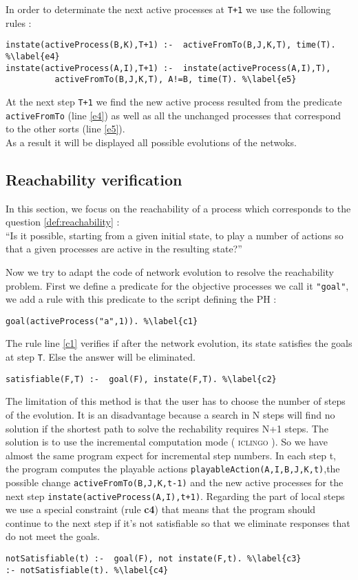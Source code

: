 In order to determinate the next active processes at \texttt{T+1} we use the following rules :
\begin{lstlisting}
instate(activeProcess(B,K),T+1) :-  activeFromTo(B,J,K,T), time(T). %\label{e4}
instate(activeProcess(A,I),T+1) :-  instate(activeProcess(A,I),T),
          activeFromTo(B,J,K,T), A!=B, time(T). %\label{e5}
\end{lstlisting}

At the next step \texttt{T+1} we find the new active process resulted from the predicate \texttt{activeFromTo} (line \ref{e4}) as well as all the unchanged processes that correspond to the other sorts (line \ref{e5}).\\
As a result it will be displayed all possible evolutions of the netwoks.
\subsection{Reachability verification}
In this section, we focus on the reachability of a process which corresponds to the question \ref{def:reachability} :\\
“Is it possible, starting from a given initial state, to play a number of actions so that a given processes are active in the resulting state?”

\noindent Now we try to adapt the code of network evolution to resolve the reachability problem. First we define a predicate for the objective processes we call it \texttt{"goal"}, we add a rule with this predicate to the script defining the PH :
\begin{lstlisting}
goal(activeProcess("a",1)). %\label{c1}
\end{lstlisting}
The rule line \ref{c1} verifies if after the network evolution, its state satisfies the goals at step \texttt{T}. Else the answer will be eliminated.
\begin{lstlisting}
satisfiable(F,T) :-  goal(F), instate(F,T). %\label{c2}
\end{lstlisting}
The limitation of this method is that the user has to choose the number of steps of the evolution. It is an disadvantage because a search in N steps will find no solution if the shortest path to solve the rechability requires N+1 steps. The solution is to use the incremental computation mode ( \textsc{iclingo} \cite{gebser2008user}).
So we have almost the same program expect for incremental step numbers. In each step t, the program computes the playable actions \texttt{playableAction(A,I,B,J,K,t)},the possible change \texttt{activeFromTo(B,J,K,t-1)} and the new active processes for the next step \texttt{instate(activeProcess(A,I),t+1)}. Regarding the part of local steps we use a special constraint (rule \textbf{c4}) that means that the program should continue to the next step if it's not satisfiable so that we eliminate responses that do not meet the goals.
\begin{lstlisting}
notSatisfiable(t) :-  goal(F), not instate(F,t). %\label{c3}
:- notSatisfiable(t). %\label{c4}
\end{lstlisting}
